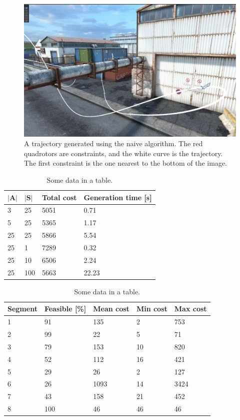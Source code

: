 \documentclass[pageno]{jpaper}
\begin{document}
\begin{figure}[hbt]
  \includegraphics[width=\linewidth]{data/rotation.png}
  \caption{A trajectory generated using the naive algorithm. The red quadrotors are constraints, and the white curve is the trajectory. The first constraint is the one nearest to the bottom of the image.}
  \label{fig:rotation}
\end{figure}




\begin{table}[hbt]
  \centering
  \begin{tabular}{|l|l|l|l|} \hline
    $|\textbf{A}|$ & $|\textbf{S}|$ & \textbf{Total cost} & \textbf{Generation time [s]} \\ \hline
    3 & 25 & 5051 & 0.71 \\ \hline
    5 & 25 & 5365 & 1.17 \\ \hline
    25 & 25 & 5866 & 5.54 \\ \hline
    25 & 1 & 7289 & 0.32 \\ \hline
    25 & 10 & 6506 & 2.24 \\ \hline
    25 & 100 & 5663 & 22.23 \\ \hline
  \end{tabular}
  \caption{Some data in a table. }
  \label{table:total}
\end{table}

\begin{table}[hbt]
  \centering
  \begin{tabular}{|l|l|l|l|l|} \hline
    \textbf{Segment} & \textbf{Feasible [\%]} & \textbf{Mean cost} & \textbf{Min cost} & \textbf{Max cost} \\ \hline
    1 & 91 & 135 & 2 & 753 \\ \hline
    2 & 99 & 22 & 5 & 71 \\ \hline
    3 & 79 & 153 & 10 & 820 \\ \hline
    4 & 52 & 112 & 16 & 421 \\ \hline
    5 & 29 & 26 & 2 & 127 \\ \hline
    6 & 26 & 1093 & 14 & 3424 \\ \hline
    7 & 43 & 158 & 21 & 452 \\ \hline
    8 & 100 & 46 & 46 & 46 \\ \hline
  \end{tabular}
  \caption{Some data in a table. }
  \label{table:segments}
\end{table}
\end{document}
